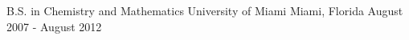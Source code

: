 

\begin{cventries}

  \cventry
    {B.S. in Chemistry and Mathematics} %
    {University of Miami} %
    {Miami, Florida} %
    {August 2007 - August 2012} %
    { }

\end{cventries}
